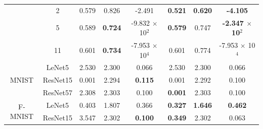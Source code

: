 \begin{table}[tbp]
{\begin{tabular}{|c|c|ccc|ccc|}
                                   & 2                                & \multicolumn{1}{c|}{0.579}          & \multicolumn{1}{c|}{0.826}          & -2.491                 & \multicolumn{1}{c|}{\textbf{0.521}}  & \multicolumn{1}{c|}{\textbf{0.620}}  & \textbf{-4.105}                 \\ \cline{2-8} 
                                   & 5                                & \multicolumn{1}{c|}{0.589}          & \multicolumn{1}{c|}{\textbf{0.724}} & -9.832 $\times$ 10$^2$ & \multicolumn{1}{c|}{\textbf{0.579}}  & \multicolumn{1}{c|}{0.747}           & \textbf{-2.347 $\times$ 10$^2$} \\ \cline{2-8} 
                                   & 11                               & \multicolumn{1}{c|}{0.601}          & \multicolumn{1}{c|}{\textbf{0.734}} & -7.953 $\times$ 10$^4$ & \multicolumn{1}{c|}{0.601}           & \multicolumn{1}{c|}{0.774}           & -7.953 $\times$ 10$^{4}$        \\ \hline
\multirow{3}{*}{MNIST}             & LeNet5                           & \multicolumn{1}{c|}{2.530}          & \multicolumn{1}{c|}{2.300}          & 0.066                  & \multicolumn{1}{c|}{2.530}           & \multicolumn{1}{c|}{2.300}           & 0.066                           \\ \cline{2-8} 
                                   & ResNet15                         & \multicolumn{1}{c|}{0.001}          & \multicolumn{1}{c|}{2.294}          & \textbf{0.115}         & \multicolumn{1}{c|}{0.001}           & \multicolumn{1}{c|}{2.292}           & 0.100                           \\ \cline{2-8} 
                                   & ResNet57                         & \multicolumn{1}{c|}{2.308}          & \multicolumn{1}{c|}{2.303}          & 0.100                  & \multicolumn{1}{c|}{\textbf{0.001}}  & \multicolumn{1}{c|}{2.303}           & 0.100                           \\ \hline
\multirow{3}{*}{F-MNIST}           & LeNet5                           & \multicolumn{1}{c|}{0.403}          & \multicolumn{1}{c|}{1.807}          & 0.366                  & \multicolumn{1}{c|}{\textbf{0.327}}  & \multicolumn{1}{c|}{\textbf{1.646}}  & \textbf{0.462}                  \\ \cline{2-8} 
                                   & ResNet15                         & \multicolumn{1}{c|}{3.547}          & \multicolumn{1}{c|}{2.302}          & \textbf{0.100}         & \multicolumn{1}{c|}{\textbf{0.349}}  & \multicolumn{1}{c|}{2.302}           & 0.063                           \\ \cline{2-8} 

\end{tabular}}
\end{table}
